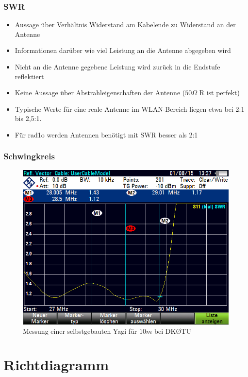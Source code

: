 \begin{frame}
  \frametitle{SWR}
  \begin{center}
    \begin{itemize}
      \item Aussage über Verhältnis Widerstand am Kabelende zu Widerstand an der Antenne
      \item Informationen darüber wie viel Leistung an die Antenne abgegeben wird
      \item Nicht an die Antenne gegebene Leistung wird zurück in die Endstufe reflektiert
      \item Keine Aussage über Abstrahleigenschaften der Antenne ($50 \Omega$ R ist perfekt)
      \item Typische Werte für eine reale Antenne im WLAN-Bereich liegen etwa bei 2:1 bis 2,5:1.
      \item Für rad1o werden Antennen benötigt mit SWR besser als 2:1
    \end{itemize}
  \end{center}
\end{frame}

\begin{frame}
  \frametitle{Schwingkreis}
  \begin{center}
    \begin{figure}
      \includegraphics[width=.7\textwidth,height=.75\textheight,keepaspectratio]{e11/Measurement0010.png}
      \caption{Messung einer selbstgebauten Yagi für $10m$ bei DK\O TU}
    \end{figure}
  \end{center}
\end{frame}


\section*{Richtdiagramm}

